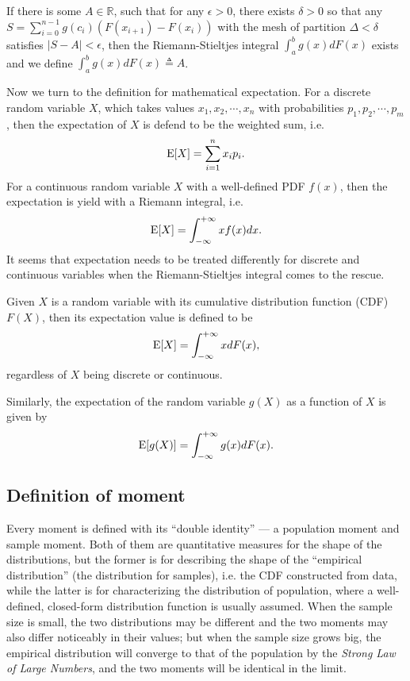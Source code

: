 \begin{defn}
If there is some $ A \in \mathbb{R} $, such that for any $ \epsilon > 0 $, there exists $ \delta > 0 $ so that any $ S = \sum_{i=0}^{n-1} g(c_i) (F(x_{i+1})-F(x_i)) $ with the mesh of partition $ \Delta < \delta  $ satisfies $ |S-A|< \epsilon $, then the Riemann-Stieltjes integral $ \int_a^b g(x) dF(x) $ exists and we define $ \int_a^b g(x) dF(x) \triangleq A $.  
\end{defn}

Now we turn to the definition for mathematical expectation. For a discrete random variable $ X $, which takes values $ x_1, x_2, \cdots, x_n $ with probabilities $ p_1, p_2, \cdots, p_m $, then the expectation of $ X $ is defend to be the weighted sum, i.e.
\begin{equation}
\E[X] = \sum_{i=1}^n x_i p_i. 
\end{equation}
For a continuous random variable $ X $ with a well-defined PDF $ f(x) $, then the expectation is yield with a Riemann integral, i.e.
\begin{equation}
\E[X] = \int_{-\infty}^{+\infty} x f(x) dx.
\end{equation}
It seems that expectation needs to be treated differently for discrete and continuous variables when the Riemann-Stieltjes integral comes to the rescue. 

\begin{defn}
Given $ X $ is a random variable with its cumulative distribution function (CDF) $ F(X) $, then its expectation value is defined to be 
\begin{equation}
\E[X] = \int_{-\infty}^{+\infty} x dF(x),
\end{equation}
regardless of $ X $ being discrete or continuous. 
\end{defn}
Similarly, the expectation of the random variable $ g(X) $ as a function of $ X $ is given by
\begin{equation}
\E [g(X)] = \int_{-\infty}^{+\infty} g(x) dF(x).
\end{equation}

\subsection{Definition of moment}
Every moment is defined with its ``double identity'' --- a population moment and sample moment. Both of them are quantitative measures for the shape of the distributions, but the former is for describing the shape of the ``empirical distribution'' (the distribution for samples), i.e. the CDF constructed from data, while the latter is for characterizing the distribution of population, where a well-defined, closed-form distribution function is usually assumed. When the sample size is small, the two distributions may be different and the two moments may also differ noticeably in their values; but when the sample size grows big, the empirical distribution  will converge to that of the population by the \textit{Strong Law of Large Numbers}, and the two moments will be identical in the limit. 

